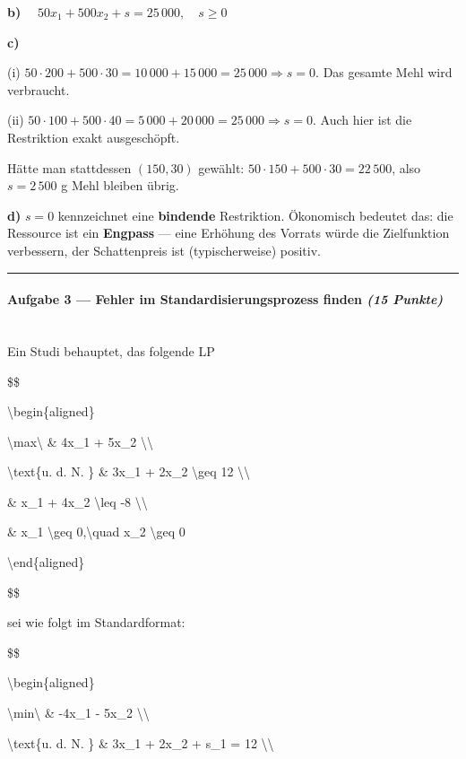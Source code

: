 \documentclass[11pt, a4paper]{article}
\begin{document}
\textbf{b)} $\quad 50 x_1 + 500 x_2 + s = 25\,000,\quad s \geq 0$


\textbf{c)}

(i) $50 \cdot 200 + 500 \cdot 30 = 10\,000 + 15\,000 = 25\,000 \Rightarrow s = 0$. Das gesamte Mehl wird verbraucht.

(ii) $50 \cdot 100 + 500 \cdot 40 = 5\,000 + 20\,000 = 25\,000 \Rightarrow s = 0$. Auch hier ist die Restriktion exakt ausgeschöpft.


Hätte man stattdessen $(150, 30)$ gewählt: $50 \cdot 150 + 500 \cdot 30 = 22\,500$, also $s = 2\,500$ g Mehl bleiben übrig.


\textbf{d)} $s = 0$ kennzeichnet eine \textbf{bindende} Restriktion. Ökonomisch bedeutet das: die Ressource ist ein \textbf{Engpass} — eine Erhöhung des Vorrats würde die Zielfunktion verbessern, der Schattenpreis ist (typischerweise) positiv.



\noindent\textcolor{rulegray}{\rule{\linewidth}{0.4pt}}


\paragraph{Aufgabe 3 — Fehler im Standardisierungsprozess finden \textit{(15 Punkte)}}\mbox{}\\[2pt]

Ein Studi behauptet, das folgende LP


\$\$

\textbackslash{}begin\{aligned\}

\textbackslash{}max\textbackslash{} \& 4x\_1 + 5x\_2 \textbackslash{}\textbackslash{}

\textbackslash{}text\{u. d. N. \} \& 3x\_1 + 2x\_2 \textbackslash{}geq 12 \textbackslash{}\textbackslash{}

\& x\_1 + 4x\_2 \textbackslash{}leq -8 \textbackslash{}\textbackslash{}

\& x\_1 \textbackslash{}geq 0,\textbackslash{}quad x\_2 \textbackslash{}geq 0

\textbackslash{}end\{aligned\}

\$\$


sei wie folgt im Standardformat:


\$\$

\textbackslash{}begin\{aligned\}

\textbackslash{}min\textbackslash{} \& -4x\_1 - 5x\_2 \textbackslash{}\textbackslash{}

\textbackslash{}text\{u. d. N. \} \& 3x\_1 + 2x\_2 + s\_1 = 12 \textbackslash{}\textbackslash{}
\end{document}
